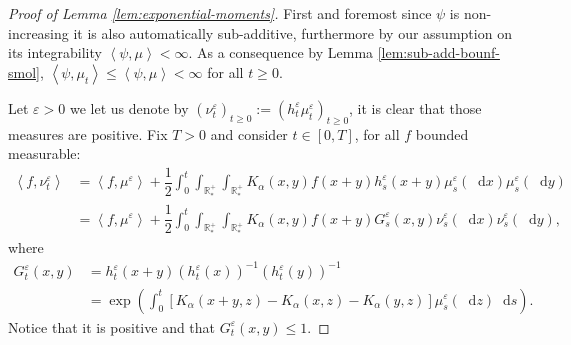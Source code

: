 \documentclass[11pt,a4paper]{article}
\newcommand{\RRP}{\mathbb{R}^+_*}
\newcommand{\Proc}[1]{\left(#1\right)_{t\geq 0}}
\newcommand{\brac}[1]{\left\langle#1\right\rangle}
\newcommand{\dd}{\mathop{}\!\mathrm{d}}
\begin{document}
\begin{proof}[Proof of Lemma \ref{lem:exponential-moments}]
    First and foremost since $\psi$ is non-increasing it is also automatically sub-additive, furthermore by our assumption on its integrability $\brac{\psi,\mu} < \infty$. As a consequence by Lemma \ref{lem:sub-add-bounf-smol}, $\brac{\psi,\mu_t}\leq \brac{\psi,\mu} < \infty$ for all $t \geq 0$.

    Let $\varepsilon > 0$ we let us denote by $\Proc{\nu_t^\varepsilon} := \Proc{h_t^\varepsilon\mu_t^\varepsilon}$, it is clear that those measures are positive. Fix $T > 0$ and consider $t \in [0,T]$, for all $f$ bounded measurable:
    \begin{align*}
        \brac{f,\nu_t^\varepsilon} &= \brac{f,\mu^\varepsilon} + \dfrac12\int_0^t \int_{\RRP}\int_{\RRP}K_\alpha(x,y)f(x+y)h_s^\varepsilon(x+y) \mu_s^\varepsilon(\dd x) \mu_s^\varepsilon(\dd y) \\
        &= \brac{f,\mu^\varepsilon} + \dfrac12\int_0^t \int_{\RRP}\int_{\RRP}K_\alpha(x,y)f(x+y)G_s^\varepsilon(x,y) \nu_s^\varepsilon(\dd x) \nu_s^\varepsilon(\dd y),
    \end{align*}
    where
    \begin{align*}
        G_t^\varepsilon(x,y) &= h_t^\varepsilon(x+y)\left(h_t^\varepsilon(x)\right)^{-1}\left(h_t^\varepsilon(y)\right)^{-1} \\
        &= \exp{\left(\int_0^t \left[K_\alpha(x+y,z) - K_\alpha(x,z) - K_\alpha(y,z)\right]\mu^\varepsilon_s(\dd z) \dd s \right)}.
    \end{align*}
    Notice that it is positive and that $G_t^\varepsilon(x,y) \leq 1$.
    

\end{proof}
\end{document}
